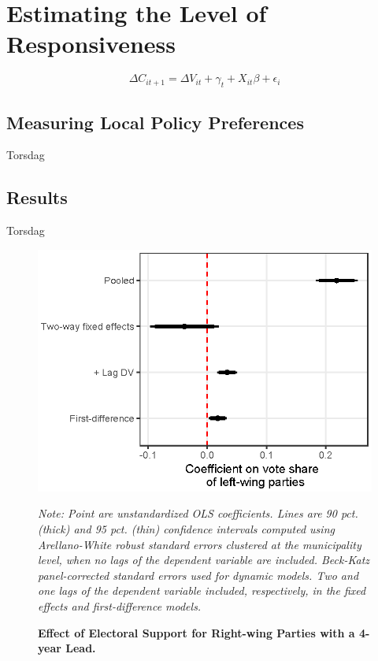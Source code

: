 \documentclass[a4paper,12pt]{article}
\newcommand\fnote[1]{\captionsetup{font=small}\caption*{#1}}
\begin{document}
\section{Estimating the Level of Responsiveness}

\begin{equation}
\Delta C_{it+1} =  \Delta V_{it} + \gamma_t +  X_{it} \beta + \epsilon_{i}
\end{equation}


\subsection{Measuring Local Policy Preferences}

Torsdag

\subsection{Results}

Torsdag


\begin{figure}[h]
	\centering
	\includegraphics[scale = 1.1]{ggplot_coef_inflation_adjusted.eps}
	\caption{\textbf{Effect of Electoral Support for Right-wing Parties with a 4-year Lead.}} \fnote{\emph{Note: Point are unstandardized OLS coefficients. Lines are 90 pct. (thick) and 95 pct. (thin) confidence intervals computed using Arellano-White robust standard errors clustered at the municipality level, when no lags of the dependent variable are included. Beck-Katz panel-corrected standard errors used for dynamic models. Two and one lags of the dependent variable included, respectively, in the fixed effects and first-difference models.}}
	\label{fig:FourYearLead}
\end{figure}
\end{document}
